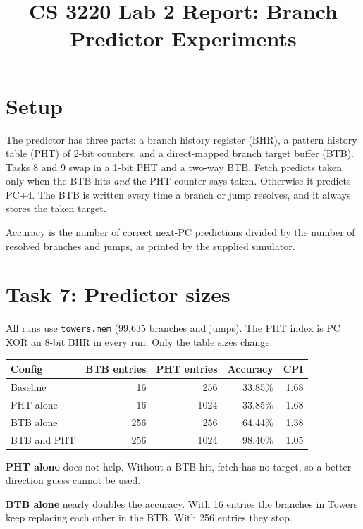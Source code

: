 \documentclass[10pt]{article}
\title{\vspace{-1.5em}CS 3220 Lab 2 Report: Branch Predictor Experiments}
\author{\todo{name}}
\date{}
\begin{document}
\maketitle
\vspace{-2em}

\section*{Setup}

The predictor has three parts: a branch history register (BHR), a pattern
history table (PHT) of 2-bit counters, and a direct-mapped branch target
buffer (BTB). Tasks 8 and 9 swap in a 1-bit PHT and a two-way BTB. Fetch predicts taken only when the BTB hits \emph{and} the PHT
counter says taken. Otherwise it predicts PC+4. The BTB is written every time
a branch or jump resolves, and it always stores the taken target.

Accuracy is the number of correct next-PC predictions divided by the number
of resolved branches and jumps, as printed by the supplied simulator.

\section*{Task 7: Predictor sizes}

All runs use \texttt{towers.mem} (99{,}635 branches and jumps). The PHT index
is PC XOR an 8-bit BHR in every run. Only the table sizes change.

\begin{center}
\begin{tabular}{lrrrr}
\toprule
Config & BTB entries & PHT entries & Accuracy & CPI \\
\midrule
Baseline      & 16  & 256  & 33.85\% & 1.68 \\
PHT alone     & 16  & 1024 & 33.85\% & 1.68 \\
BTB alone     & 256 & 256  & 64.44\% & 1.38 \\
BTB and PHT   & 256 & 1024 & 98.40\% & 1.05 \\
\bottomrule
\end{tabular}
\end{center}

\textbf{PHT alone} does not help. Without a BTB hit, fetch has no target, so
a better direction guess cannot be used.

\textbf{BTB alone} nearly doubles the accuracy. With 16 entries the branches
in Towers keep replacing each other in the BTB. With 256 entries they stop.
\end{document}
